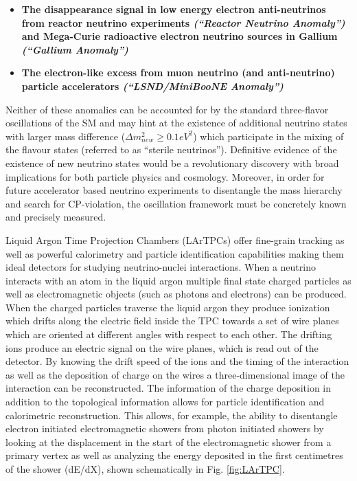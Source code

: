 \begin{itemize}
\item \textbf{The disappearance signal in low energy electron anti-neutrinos from reactor neutrino experiments \cite{No13} \textit{(``Reactor Neutrino Anomaly'')} and Mega-Curie radioactive electron neutrino sources in Gallium \cite{No14, No15} \textit{(``Gallium Anomaly'')}}

\item \textbf{The electron-like excess from muon neutrino (and anti-neutrino) particle accelerators \textit{(``LSND/MiniBooNE Anomaly'')} \cite{No16, No17}}

\end{itemize}

Neither of these anomalies can be accounted for by the standard three-flavor oscillations of the SM and may hint at the existence of additional neutrino states with larger mass difference ($\Delta m_{new}^{2}\geq 0.1 eV^{2}$) which participate in the mixing of the flavour states (referred to as ``sterile neutrinos''). Definitive evidence of the existence of new neutrino states would be a revolutionary discovery with broad implications for both particle physics and cosmology. Moreover, in order for future accelerator based neutrino experiments to disentangle the mass hierarchy and search for CP-violation, the oscillation framework must be concretely known and precisely measured.

Liquid Argon Time Projection Chambers (LArTPCs) offer fine-grain tracking as well as powerful calorimetry and particle identification capabilities making them ideal detectors for studying neutrino-nuclei interactions. When a neutrino interacts with an atom in the liquid argon multiple final state charged particles as well as electromagnetic objects (such as photons and electrons) can be produced. When the charged particles traverse the liquid argon they produce ionization which drifts along the electric field inside the TPC towards a set of wire planes which are oriented at different angles with respect to each other. The drifting ions produce an electric signal on the wire planes, which is read out of the detector. By knowing the drift speed of the ions and the timing of the interaction as well as the deposition of charge on the wires a three-dimensional image of the interaction can be reconstructed. The information of the charge deposition in addition to the topological information allows for particle identification and calorimetric reconstruction. This allows, for example, the ability to disentangle electron initiated electromagnetic showers from photon initiated showers by looking at the displacement in the start of the electromagnetic shower from a primary vertex as well as analyzing the energy deposited in the first centimetres of the shower (dE/dX), shown schematically in Fig. \ref{fig:LArTPC}.

